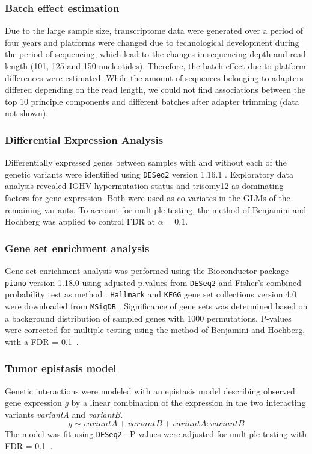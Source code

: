 \subsubsection{Batch effect estimation}
Due to the large sample size, transcriptome data were generated over a period of four years and platforms were changed due to technological development during the period of sequencing, which lead to the changes in sequencing depth and read length (101, 125 and 150 nucleotides). Therefore, the batch effect due to platform differences were estimated. While the amount of sequences belonging to adapters differed depending on the read length, we could not find associations between the top 10 principle components and different batches after adapter trimming (data not shown).  


\subsubsection{Differential Expression Analysis}
Differentially expressed genes between samples with and without each of the genetic variants were identified using \texttt{DESeq2} version 1.16.1 \citep{Love2014}. Exploratory data analysis revealed IGHV hypermutation status and trisomy12 as dominating factors for gene expression. Both were used as co-variates in the GLMs of the remaining variants. To account for multiple testing, the method of Benjamini and Hochberg \citep{Benjamini} was applied to control FDR at $\alpha=0.1$.   

\subsubsection{Gene set enrichment analysis}
Gene set enrichment analysis was performed using the Bioconductor package \texttt{piano} version 1.18.0 \citep{Varemo} using adjusted p.values from \texttt{DESeq2} and Fisher’s combined probability test as method \citep{Fisher1932}. \texttt{Hallmark} and \texttt{KEGG} gene set collections version 4.0 were downloaded from \texttt{MSigDB} \citep{Liberzon2015, Kanehisa2017}. Significance of gene sets was determined based on a background distribution of sampled genes with 1000 permutations. P-values were corrected for multiple testing using the method of Benjamini and Hochberg, with a FDR = 0.1~\citep{Benjamini}.


\subsubsection{Tumor epistasis model}
Genetic interactions were modeled with an epistasis model describing observed gene expression \textit{g} by a linear combination of the expression in the two interacting variants \textit{variantA} and \textit{variantB}.
\begin{equation}
 g \sim variantA + variantB + variantA:variantB
\end{equation}
The model was fit using \texttt{DESeq2} \citep{Love2014}. P-values were adjusted for multiple testing with FDR = 0.1~\citep{Benjamini}.


